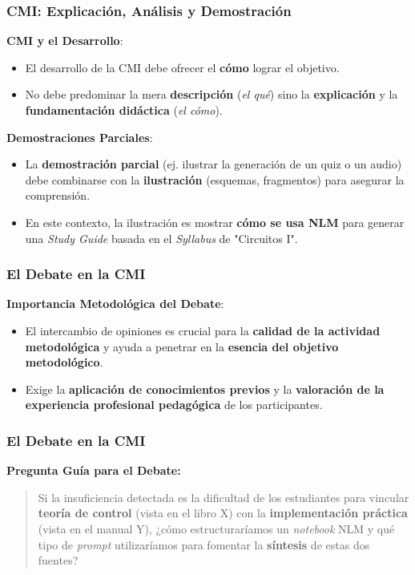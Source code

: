 \documentclass[aspectratio=43]{beamer}
\begin{document}
\begin{frame}
\frametitle{ CMI: Explicación, Análisis y Demostración}

\textbf{CMI y el Desarrollo}:
\begin{itemize}
    \item El desarrollo de la CMI debe ofrecer el \textbf{cómo} lograr el objetivo.
    \item No debe predominar la mera \textbf{descripción} (\textit{el qué}) sino la \textbf{explicación} y la \textbf{fundamentación didáctica} (\textit{el cómo}).
\end{itemize}

\vfill
\textbf{Demostraciones Parciales}:
\begin{itemize}
    \item La \textbf{demostración parcial} (ej. ilustrar la generación de un quiz o un audio) debe combinarse con la \textbf{ilustración} (esquemas, fragmentos) para asegurar la comprensión.
    \item En este contexto, la ilustración es mostrar \textbf{cómo se usa NLM} para generar una \textit{Study Guide} basada en el \textit{Syllabus} de "Circuitos I".
\end{itemize}
\end{frame}

\begin{frame}
\frametitle{ El Debate en la CMI}

\textbf{Importancia Metodológica del Debate}:
\begin{itemize}
    \item El intercambio de opiniones es crucial para la \textbf{calidad de la actividad metodológica} y ayuda a penetrar en la \textbf{esencia del objetivo metodológico}.
    \item Exige la \textbf{aplicación de conocimientos previos} y la \textbf{valoración de la experiencia profesional pedagógica} de los participantes.
\end{itemize}
\end{frame}

\begin{frame}
\frametitle{ El Debate en la CMI}
\textbf{Pregunta Guía para el Debate:}
\begin{quote}
Si la insuficiencia detectada es la dificultad de los estudiantes para vincular \textbf{teoría de control} (vista en el libro X) con la \textbf{implementación práctica} (vista en el manual Y), ¿cómo estructuraríamos un \textit{notebook} NLM y qué tipo de \textit{prompt} utilizaríamos para fomentar la \textbf{síntesis} de estas dos fuentes?
\end{quote}
\end{frame}
\end{document}
